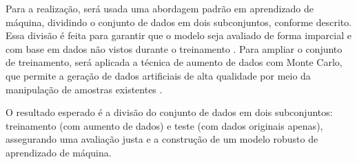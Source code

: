 Para a realização, será usada uma abordagem padrão em aprendizado de máquina, dividindo o conjunto de dados em dois subconjuntos, conforme descrito. Essa divisão é feita para garantir que o modelo seja avaliado de forma imparcial e com base em dados não vistos durante o treinamento \cite{bashir2020}. Para ampliar o conjunto de treinamento, será aplicada a técnica de aumento de dados com Monte Carlo, que permite a geração de dados artificiais de alta qualidade por meio da manipulação de amostras existentes \cite{wang2024}. 

O resultado esperado é a divisão do conjunto de dados em dois subconjuntos: treinamento (com aumento de dados) e teste (com dados originais apenas), assegurando uma avaliação justa e a construção de um modelo robusto de aprendizado de máquina.

\begin{table}[h!]
  \centering
  \renewcommand{\arraystretch}{1.0} 
  \captionsetup{font=footnotesize, justification=centering, labelsep=period, position=above}
  \caption{Fase 2: Desenvolvimento e Avaliação do Modelo}
  \label{tab:fase2}
\end{table}

